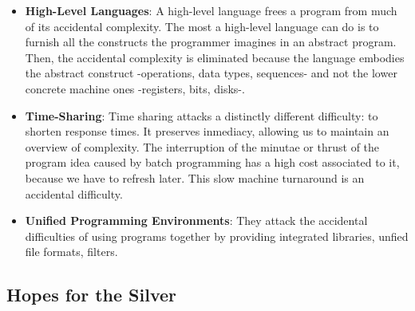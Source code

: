 \documentclass[letterpaper,12pt,parskip=full]{article}
\begin{document}
\begin{itemize}
    \item \textbf{High-Level Languages}: A high-level language frees a program from much of its accidental complexity. The most a high-level language can do is to furnish all the constructs the programmer imagines in an abstract program. Then, the accidental complexity is eliminated because the language embodies the abstract construct -operations, data types, sequences- and not the lower concrete machine ones -registers, bits, disks-.
    \item \textbf{Time-Sharing}: Time sharing attacks a distinctly different difficulty: to shorten response times. It preserves inmediacy, allowing us to maintain an overview of complexity. The interruption of the minutae or thrust of the program idea caused by batch programming has a high cost associated to it, because we have to refresh later. This slow machine turnaround is an accidental difficulty.
    \item \textbf{Unified Programming Environments}: They attack the accidental difficulties of using programs together by providing integrated libraries, unfied file formats, filters.
\end{itemize}

\subsection{Hopes for the Silver}
\end{document}
